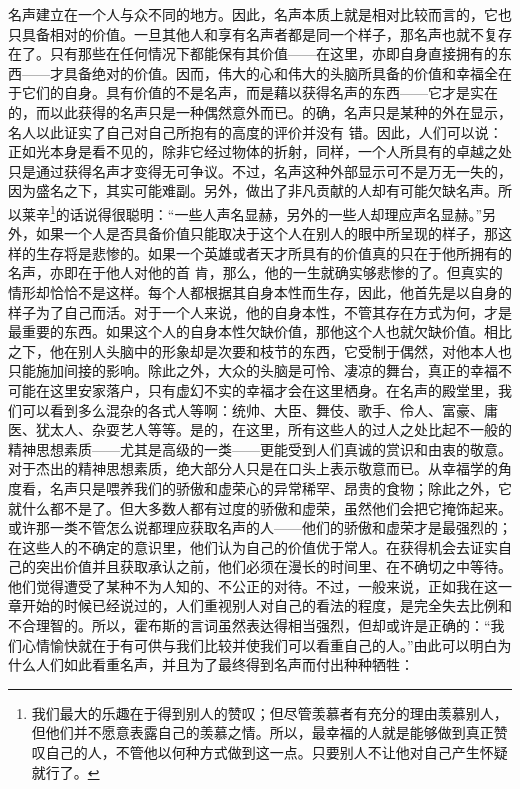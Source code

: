\documentclass[12pt,oneside]{book}
\begin{document}
名声建立在一个人与众不同的地方。因此，名声本质上就是相对比较而言的，它也只具备相对的价值。一旦其他人和享有名声者都是同一个样子，那名声也就不复存在了。只有那些在任何情况下都能保有其价值——在这里，亦即自身直接拥有的东西——才具备绝对的价值。因而，伟大的心和伟大的头脑所具备的价值和幸福全在于它们的自身。具有价值的不是名声，而是藉以获得名声的东西——它才是实在的，而以此获得的名声只是一种偶然意外而已。的确，名声只是某种的外在显示，名人以此证实了自己对自己所抱有的高度的评价并没有
错。因此，人们可以说：正如光本身是看不见的，除非它经过物体的折射，同样，一个人所具有的卓越之处只是通过获得名声才变得无可争议。不过，名声这种外部显示可不是万无一失的，因为盛名之下，其实可能难副。另外，做出了非凡贡献的人却有可能欠缺名声。所以莱辛\footnote{我们最大的乐趣在于得到别人的赞叹；但尽管羡慕者有充分的理由羡慕别人，但他们并不愿意表露自己的羡慕之情。所以，最幸福的人就是能够做到真正赞叹自己的人，不管他以何种方式做到这一点。只要别人不让他对自己产生怀疑就行了。}的话说得很聪明：“一些人声名显赫，另外的一些人却理应声名显赫。”另外，如果一个人是否具备价值只能取决于这个人在别人的眼中所呈现的样子，那这样的生存将是悲惨的。如果一个英雄或者天才所具有的价值真的只在于他所拥有的名声，亦即在于他人对他的首
肯，那么，他的一生就确实够悲惨的了。但真实的情形却恰恰不是这样。每个人都根据其自身本性而生存，因此，他首先是以自身的样子为了自己而活。对于一个人来说，他的自身本性，不管其存在方式为何，才是最重要的东西。如果这个人的自身本性欠缺价值，那他这个人也就欠缺价值。相比之下，他在别人头脑中的形象却是次要和枝节的东西，它受制于偶然，对他本人也只能施加间接的影响。除此之外，大众的头脑是可怜、凄凉的舞台，真正的幸福不可能在这里安家落户，只有虚幻不实的幸福才会在这里栖身。在名声的殿堂里，我们可以看到多么混杂的各式人等啊：统帅、大臣、舞伎、歌手、伶人、富豪、庸医、犹太人、杂耍艺人等等。是的，在这里，所有这些人的过人之处比起不一般的精神思想素质——尤其是高级的一类——更能受到人们真诚的赏识和由衷的敬意。对于杰出的精神思想素质，绝大部分人只是在口头上表示敬意而已。从幸福学的角度看，名声只是喂养我们的骄傲和虚荣心的异常稀罕、昂贵的食物；除此之外，它就什么都不是了。但大多数人都有过度的骄傲和虚荣，虽然他们会把它掩饰起来。或许那一类不管怎么说都理应获取名声的人——他们的骄傲和虚荣才是最强烈的；在这些人的不确定的意识里，他们认为自己的价值优于常人。在获得机会去证实自己的突出价值并且获取承认之前，他们必须在漫长的时间里、在不确切之中等待。他们觉得遭受了某种不为人知的、不公正的对待。不过，一般来说，正如我在这一章开始的时候已经说过的，人们重视别人对自己的看法的程度，是完全失去比例和不合理智的。所以，霍布斯的言词虽然表达得相当强烈，但却或许是正确的：“我们心情愉快就在于有可供与我们比较并使我们可以看重自己的人。”由此可以明白为什么人们如此看重名声，并且为了最终得到名声而付出种种牺牲： 
\end{document}
